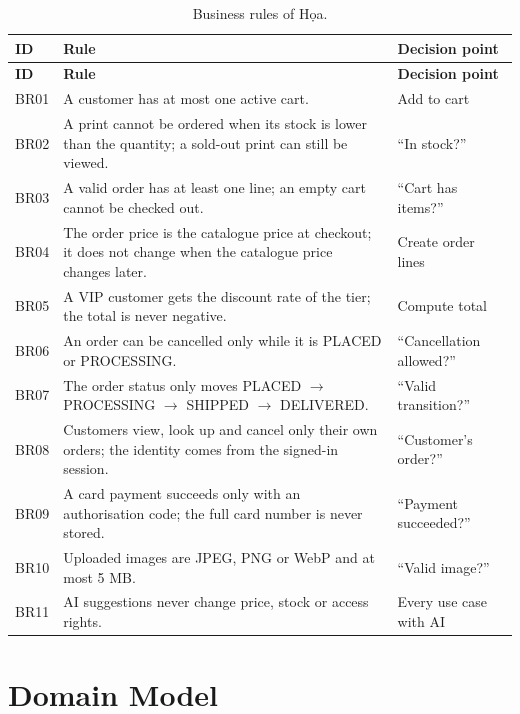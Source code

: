 \begin{longtable}{@{}P{1.3cm}P{10.0cm}P{3.7cm}@{}}
\caption{Business rules of Họa.}\label{tab:rules}\\
\toprule
\textbf{ID} & \textbf{Rule} & \textbf{Decision point}\\
\midrule
\endfirsthead
\toprule
\textbf{ID} & \textbf{Rule} & \textbf{Decision point}\\
\midrule
\endhead
\small BR01 & \small A customer has at most one active cart. & \small Add to cart\\
\small BR02 & \small A print cannot be ordered when its stock is lower than the quantity; a sold-out print can still be viewed. & \small ``In stock?''\\
\small BR03 & \small A valid order has at least one line; an empty cart cannot be checked out. & \small ``Cart has items?''\\
\small BR04 & \small The order price is the catalogue price at checkout; it does not change when the catalogue price changes later. & \small Create order lines\\
\small BR05 & \small A VIP customer gets the discount rate of the tier; the total is never negative. & \small Compute total\\
\small BR06 & \small An order can be cancelled only while it is PLACED or PROCESSING. & \small ``Cancellation allowed?''\\
\small BR07 & \small The order status only moves PLACED $\rightarrow$ PROCESSING $\rightarrow$ SHIPPED $\rightarrow$ DELIVERED. & \small ``Valid transition?''\\
\small BR08 & \small Customers view, look up and cancel only their own orders; the identity comes from the signed-in session. & \small ``Customer's order?''\\
\small BR09 & \small A card payment succeeds only with an authorisation code; the full card number is never stored. & \small ``Payment succeeded?''\\
\small BR10 & \small Uploaded images are JPEG, PNG or WebP and at most 5 MB. & \small ``Valid image?''\\
\small BR11 & \small AI suggestions never change price, stock or access rights. & \small Every use case with AI\\
\bottomrule
\end{longtable}

\section{Domain Model}\label{sec:2.7}

